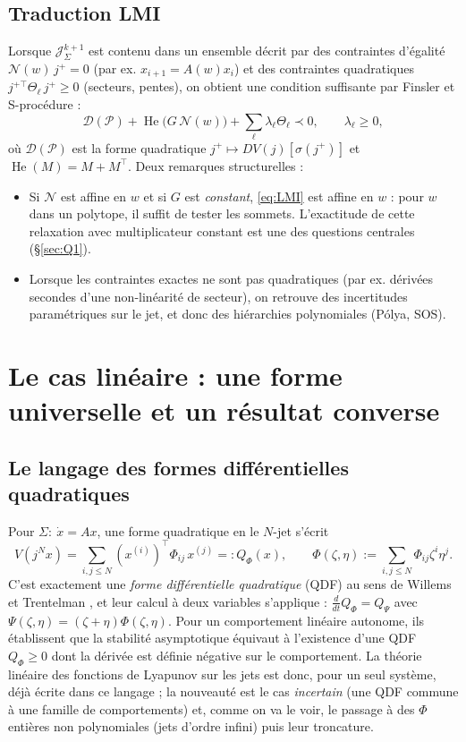 \documentclass[11pt,a4paper]{article}
\theoremstyle{definition}
\theoremstyle{remark}
\newcommand{\jet}[2]{j^{#1}#2}
\newcommand{\Jet}{\mathcal{J}}
\newcommand{\tr}{^{\top}}
\DeclareMathOperator{\He}{He}
\begin{document}
\subsection{Traduction LMI}
Lorsque $\Jet^{k+1}_\Sigma$ est contenu dans un ensemble décrit par des contraintes d'égalité $\mathcal N(w)\, j^+ = 0$ (par ex. $x_{i+1} = A(w)x_i$) et des contraintes quadratiques $j^{+\top} \Theta_\ell\, j^+\ge 0$ (secteurs, pentes), on obtient une condition suffisante par Finsler et S-procédure :
\begin{equation}\label{eq:LMI}
\mathcal D(\mathcal P) + \He\big(G\,\mathcal N(w)\big) + \sum_\ell \lambda_\ell\Theta_\ell \prec 0,\qquad \lambda_\ell\ge 0,
\end{equation}
où $\mathcal D(\mathcal P)$ est la forme quadratique $j^+\mapsto DV(j)[\sigma(j^+)]$ et $\He(M)=M+M\tr$. Deux remarques structurelles :
\begin{itemize}[nosep]
\item Si $\mathcal N$ est affine en $w$ et si $G$ est \emph{constant}, \eqref{eq:LMI} est affine en $w$ : pour $w$ dans un polytope, il suffit de tester les sommets. L'exactitude de cette relaxation avec multiplicateur constant est une des questions centrales (\S\ref{sec:Q1}).
\item Lorsque les contraintes exactes ne sont pas quadratiques (par ex. dérivées secondes d'une non-linéarité de secteur), on retrouve des incertitudes paramétriques sur le jet, et donc des hiérarchies polynomiales (Pólya, SOS).
\end{itemize}

\section{Le cas linéaire : une forme universelle et un résultat converse}\label{sec:LTI}

\subsection{Le langage des formes différentielles quadratiques}
Pour $\Sigma:\ \dot x = Ax$, une forme quadratique en le $N$-jet s'écrit
\[
V(\jet{N}{x}) = \sum_{i,j\le N} (x^{(i)})\tr \Phi_{ij}\, x^{(j)} =: Q_\Phi(x),\qquad \Phi(\zeta,\eta) := \sum_{i,j\le N}\Phi_{ij}\zeta^i\eta^j.
\]
C'est exactement une \emph{forme différentielle quadratique} (QDF) au sens de Willems et Trentelman \cite{WT98}, et leur calcul à deux variables s'applique : $\frac{d}{dt}Q_\Phi = Q_\Psi$ avec $\Psi(\zeta,\eta) = (\zeta+\eta)\Phi(\zeta,\eta)$. Pour un comportement linéaire autonome, ils établissent que la stabilité asymptotique équivaut à l'existence d'une QDF $Q_\Phi\ge0$ dont la dérivée est définie négative sur le comportement. La théorie linéaire des fonctions de Lyapunov sur les jets est donc, pour un seul système, déjà écrite dans ce langage ; la nouveauté est le cas \emph{incertain} (une QDF commune à une famille de comportements) et, comme on va le voir, le passage à des $\Phi$ entières non polynomiales (jets d'ordre infini) puis leur troncature.
\end{document}
